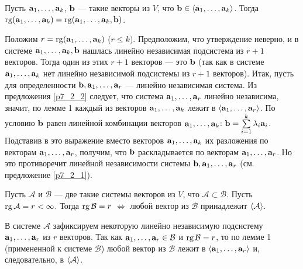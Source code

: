 \otstup

\begin{lem2} Пусть $\mathbf{a}_1, \ldots , \mathbf{a}_k$, $\mathbf{b}$ --- такие векторы из $V$, что 
$\vek{b}\in \lin{\vek{a}_1, \hm\ldots , \vek{a}_k}$.
Тогда
$\rg (\vek{a}_1, \hm\ldots , \vek{a}_k) \hm= \rg (\vek{a}_1, \hm\ldots , \vek{a}_k, \vek{b})$.
\end{lem2}
\dok %
Положим $r=\rg (\vek{a}_1, \hm\ldots , \vek{a}_k)$ ($r\leq k$).
Предположим, что утверждение неверно, и в системе $\vek{a}_1, \hm\ldots , \vek{a}_k, \vek{b}$ нашлась
линейно независимая подсистема из $r+1$ векторов. Тогда один из этих
$r+1$ векторов --- это $\mathbf{b}$ (так как в системе $\vek{a}_1, \hm\ldots , \vek{a}_k$ нет линейно независимой подсистемы из
$r+1$ векторов).
Итак, пусть для определенности $\vek{b}, \vek{a}_1, \hm\ldots , \vek{a}_r$ --- линейно независимая система.
Из предложения \ref{p7_2_2} следует, что система $\vek{a}_1, \hm\ldots , \vek{a}_r$  линейно независима,
значит, по лемме 1 каждый из векторов $\vek{a}_1, \hm\ldots , \vek{a}_k$
лежит в $\lin{\vek{a}_1, \hm\ldots , \vek{a}_r}$.
По условию $\mathbf{b}$ равен линейной комбинации векторов $\vek{a}_1, \hm\ldots , \vek{a}_k$:
$\mathbf{b} = \sum\limits_{i=1}^{k}\lambda _i \mathbf{a}_i$.
Подставив в это выражение %
вместо векторов  $\vek{a}_1, \hm\ldots , \vek{a}_k$ их разложения по векторам $\vek{a}_1, \hm\ldots , \vek{a}_r$, получим, что
$\mathbf{b}$ раскладывается по векторам $\vek{a}_1, \hm\ldots , \vek{a}_r$.
Но это противоречит линейной независимости
системы $\vek{b}, \vek{a}_1, \hm\ldots , \vek{a}_r$  (см. предложение \ref{p7_2_1}).
\edok

\otstup

\begin{theor}\label{t5_2_1}
Пусть $\mathcal{A}$ и $\mathcal{B}$ --- две такие системы векторов из $V$, что $\mathcal{A} \subset \mathcal{B}$.
Пусть $\mathop{\rm rg}\nolimits \mathcal{A} = r< \infty$. Тогда $\mathop{\rm rg}\nolimits \mathcal{B} = r$ $\Leftrightarrow$
любой вектор из $\mathcal{B}$ принадлежит $\langle \mathcal{A} \rangle$.
\end{theor}
\dok
\dokright В системе $\mathcal{A} $ зафиксируем некоторую линейно независимую подсистему
$\mathbf{a}_1, \ldots, \mathbf{a}_r$ из $r$ векторов.
Так как $\vek{a}_1, \ldots, \vek{a}_r\hm\in \mathcal{B}$ и $\mathop{\rm rg}\nolimits \mathcal{B} = r$,
то по лемме 1 (примененной к системе $\mathcal{B}$) любой вектор из $\mathcal{B}$ лежит в
$\langle \mathbf{a}_1, \ldots, \mathbf{a}_r \rangle$ и, следовательно, в $\langle \mathcal{A} \rangle$.

